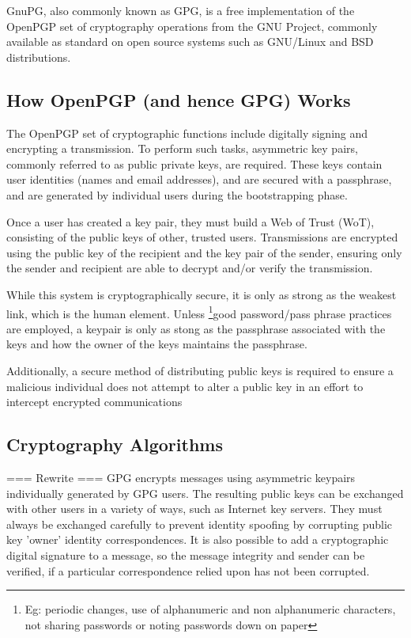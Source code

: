 
GnuPG, also commonly known as GPG, is a free implementation of the
OpenPGP set of cryptography operations from the GNU Project, commonly
available as standard on open source systems such as GNU/Linux and BSD 
distributions.


\subsection{How OpenPGP (and hence GPG) Works}

The OpenPGP set of cryptographic functions include digitally signing and
encrypting a transmission. To perform such tasks, asymmetric key pairs,
commonly referred to as public private keys, are required. These keys
contain user identities (names and email addresses), and are secured 
with a passphrase, and are generated by individual users during the 
bootstrapping phase.


Once a user has created a key pair, they must build a Web of Trust 
(WoT), consisting of the public keys of other, trusted users.
Transmissions are encrypted using the public key of the recipient and
the key pair of the sender, ensuring only the sender and recipient are
able to decrypt and/or verify the transmission.


While this system is cryptographically secure, it is only as strong as
the weakest link, which is the human element. Unless 
\footnote{Eg: periodic changes, use of alphanumeric and non
alphanumeric characters, not sharing passwords or noting passwords down
on paper}{good password/pass phrase practices} are employed, a
keypair is only as stong as the passphrase associated with the keys and
how the owner of the keys maintains the passphrase.


Additionally, a secure method of distributing public keys is required to
ensure a malicious individual does not attempt to alter a public key in
an effort to intercept encrypted communications

\subsection{Cryptography Algorithms}



=== Rewrite ===
GPG encrypts messages using asymmetric keypairs individually generated
by GPG users. The resulting public keys can be exchanged with other
users in a variety of ways, such as Internet key servers. They must
always be exchanged carefully to prevent identity spoofing by
corrupting public key 'owner' identity correspondences. It is
also possible to add a cryptographic digital signature to a message, so
the message integrity and sender can be verified, if a particular
correspondence relied upon has not been corrupted.

